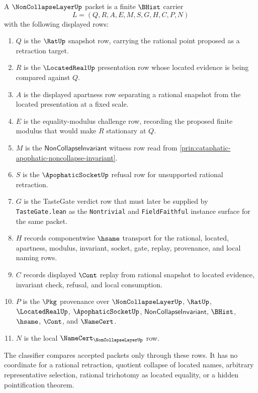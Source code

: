 \begin{definition}
\label{def:noncollapse-layer-packet}
A $\NonCollapseLayerUp$ packet is a finite $\BHist$ carrier
$$
L=(Q,R,A,E,M,S,G,H,C,P,N)
$$
with the following displayed rows:
\begin{enumerate}
\item $Q$ is the $\RatUp$ snapshot row, carrying the rational point proposed as a retraction target.
\item $R$ is the $\LocatedRealUp$ presentation row whose located evidence is being compared against $Q$.
\item $A$ is the displayed apartness row separating a rational snapshot from the located presentation at a fixed scale.
\item $E$ is the equality-modulus challenge row, recording the proposed finite modulus that would make $R$ stationary at $Q$.
\item $M$ is the $\mathsf{NonCollapseInvariant}$ witness row read from \autoref{prin:cataphatic-apophatic-noncollapse-invariant}.
\item $S$ is the $\ApophaticSocketUp$ refusal row for unsupported rational retraction.
\item $G$ is the TasteGate verdict row that must later be supplied by \texttt{TasteGate.lean} as the \texttt{Nontrivial} and \texttt{FieldFaithful} instance surface for the same packet.
\item $H$ records componentwise $\hsame$ transport for the rational, located, apartness, modulus, invariant, socket, gate, replay, provenance, and local naming rows.
\item $C$ records displayed $\Cont$ replay from rational snapshot to located evidence, invariant check, refusal, and local consumption.
\item $P$ is the $\Pkg$ provenance over $\NonCollapseLayerUp$, $\RatUp$, $\LocatedRealUp$, $\ApophaticSocketUp$, $\mathsf{NonCollapseInvariant}$, $\BHist$, $\hsame$, $\Cont$, and $\NameCert$.
\item $N$ is the local $\NameCert_{\NonCollapseLayerUp}$ row.
\end{enumerate}
The classifier compares accepted packets only through these rows. It has no coordinate for a rational retraction, quotient collapse of located names, arbitrary representative selection, rational trichotomy as located equality, or a hidden pointification theorem.
\end{definition}

